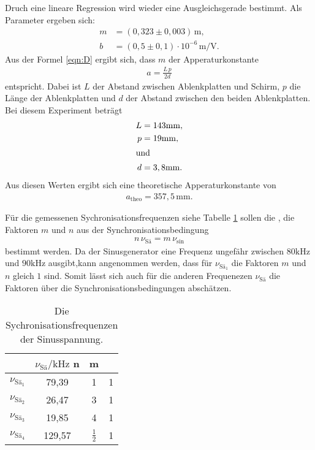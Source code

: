 Druch eine lineare Regression wird wieder eine Ausgleichsgerade bestimmt.
Als Parameter ergeben sich:
\begin{align*}
  m&=(0,323\pm0,003)\,\si{\meter},\\
  b&=(0,5\pm0,1)\cdot10^{-6}\,\si{\meter\per\volt}.
\end{align*}
Aus der Formel
\eqref{eqn:D} ergibt sich, dass $m$ der Apperaturkonstante
\begin{align*}
  a=\frac{L\,p}{2d}
\end{align*}
entspricht.
Dabei ist $L$ der Abstand zwischen Ablenkplatten und Schirm,
$p$ die Länge der Ablenkplatten und $d$ der Abstand zwischen den
beiden Ablenkplatten.
Bei diesem Experiment beträgt
\begin{align*}
  L&=143\si{\milli\meter},\\
  p&=19\si{\milli\meter},\\
\shortintertext{und}
  d&=3,8\si{\milli\meter}.
\end{align*}
Aus diesen Werten ergibt sich eine theoretische Apperaturkonstante
von
\begin{align*}
  a_\mathrm{theo}=357,5\,\si{\milli\meter}.
\end{align*}

Für die gemessenen Sychronisationsfrequenzen siehe Tabelle \ref{tab:syn}
sollen die ,
die Faktoren $m$ und $n$
aus der Synchronisationsbedingung
\begin{align*}
  n\,\nu_\mathrm{Sä}=m\,\nu_\mathrm{sin}
\end{align*}
bestimmt werden.
Da der Sinusgenerator eine Frequenz
ungefähr zwischen $80\si{\kilo\hertz}$ und $90\si{\kilo\hertz}$
ausgibt,kann angenommen werden, dass für $\nu_\mathrm{Sä_1}$ die Faktoren $m$ und $n$
gleich $1$ sind. Somit lässt sich auch für die anderen Frequenezen $\nu_\mathrm{Sä}$ die Faktoren über
die Synchronisationsbedingungen abschätzen.

\begin{table}
  \centering
  \caption{Die Sychronisationsfrequenzen der Sinusspannung.}
  \label{tab:syn}
  \begin{tabular}{c c c c}
\toprule  %
 &  $ \nu_\mathrm{Sä} / \si{\kilo\hertz} $  n & m \\
\midrule
$\nu_\mathrm{Sä_1}$ & 79,39  & 1 & 1 \\
$\nu_\mathrm{Sä_2}$ & 26,47  & 3 & 1 \\
$\nu_\mathrm{Sä_3}$ & 19,85  & 4 & 1 \\
$\nu_\mathrm{Sä_4}$ & 129,57 & $\frac{1}{2}$ & 1\\
\bottomrule
\end{tabular}
\end{table}
\FloatBarrier

